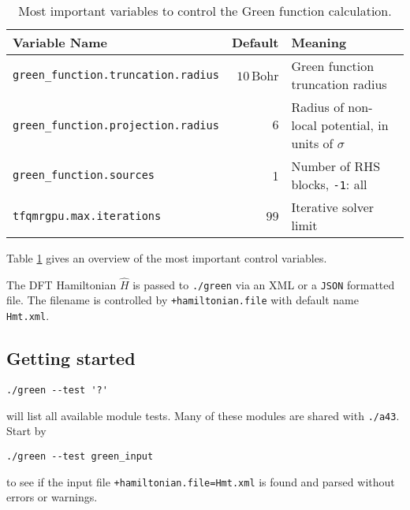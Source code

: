 \documentclass[oribibl]{llncs}
\newcommand{\ttt}[1]{\texttt{#1}}
\begin{document}
%
\begin{table}[h]
\caption[Main Variables]{
Most important variables to control the Green function calculation.
} \label{tab:main-green-variables}
\centering
\begin{tabular}{|l|r|l|}
\hline
  Variable Name & Default & Meaning \\
\hline
  \ttt{green\_function.truncation.radius} & $10\,$Bohr   & Green function truncation radius \\
  \ttt{green\_function.projection.radius} & $6$          & Radius of non-local potential, in units of $\sigma$ \\
  \ttt{green\_function.sources}			  & 1            & Number of \ac{RHS} blocks, \ttt{-1}: all \\
  \ttt{tfqmrgpu.max.iterations}           & $99$         & Iterative solver limit \\
\hline
\end{tabular}
\end{table}
%
\noindent
Table \ref{tab:main-green-variables} gives an overview of the most important control variables.

\noindent
The \ac{DFT} Hamiltonian $\hat H$ is passed to \ttt{./green} via an \ac{XML} or a \ttt{JSON} formatted file.
The filename is controlled by \ttt{+hamiltonian.file} with default name \ttt{Hmt.xml}.

\subsection{Getting started} \label{sec:green-getting-started}
%
\begin{verbatim}
./green --test '?'
\end{verbatim}
will list all available module tests. Many of these modules are shared with \ttt{./a43}.
Start by
\begin{verbatim}
./green --test green_input
\end{verbatim}
to see if the input file \ttt{+hamiltonian.file=Hmt.xml} is found and parsed without errors or warnings.
\end{document}

